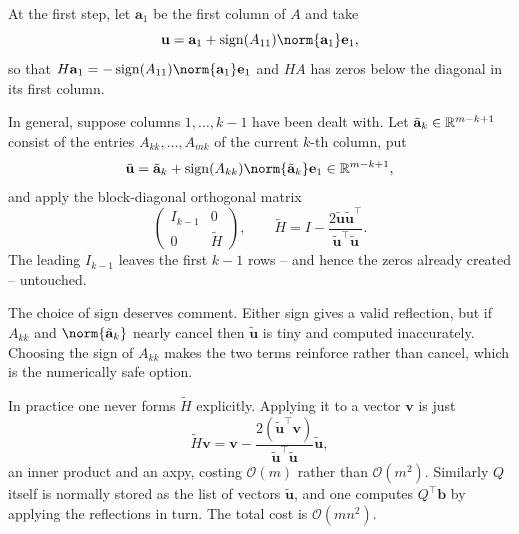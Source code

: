 \documentclass[a4paper]{scrartcl}
\begin{document}
\begin{method}[Householder QR]
  At the first step, let $\mathbf a_1$ be the first column of $A$ and take
  $$
  \mathbf u = \mathbf a_1 + \sign(A_{11})\norm{\mathbf a_1}\mathbf e_1,
  $$
  so that $H\mathbf a_1 = -\sign(A_{11})\norm{\mathbf a_1}\mathbf e_1$ and $HA$ has zeros below the diagonal in its first column.

  In general, suppose columns $1, \dots, k-1$ have been dealt with. Let $\tilde{\mathbf a}_k \in \mathbb{R}^{m-k+1}$ consist of the entries $A_{kk}, \dots, A_{mk}$ of the current $k$-th column, put
  $$
  \tilde{\mathbf u} = \tilde{\mathbf a}_k + \sign(A_{kk})\norm{\tilde{\mathbf a}_k}\mathbf e_1 \in \R^{m-k+1},
  $$
  and apply the block-diagonal orthogonal matrix
  $$
  \begin{pmatrix} I_{k-1} & 0\\ 0 & \tilde H\end{pmatrix}, \qquad \tilde H = I - \frac{2\tilde{\mathbf u}\tilde{\mathbf u}^\top}{\tilde{\mathbf u}^\top\tilde{\mathbf u}}.
  $$
  The leading $I_{k-1}$ leaves the first $k-1$ rows -- and hence the zeros already created -- untouched.
\end{method}

The choice of sign deserves comment. Either sign gives a valid reflection, but if $A_{kk}$ and $\norm{\tilde{\mathbf a}_k}$ nearly cancel then $\tilde{\mathbf u}$ is tiny and computed inaccurately. Choosing the sign of $A_{kk}$ makes the two terms reinforce rather than cancel, which is the numerically safe option.

In practice one never forms $\tilde H$ explicitly. Applying it to a vector $\mathbf v$ is just
$$
\tilde H\mathbf v = \mathbf v - \frac{2(\tilde{\mathbf u}^\top\mathbf v)}{\tilde{\mathbf u}^\top\tilde{\mathbf u}}\tilde{\mathbf u},
$$
an inner product and an axpy, costing $\mathcal{O}(m)$ rather than $\mathcal{O}(m^2)$. Similarly $Q$ itself is normally stored as the list of vectors $\tilde{\mathbf u}$, and one computes $Q^\top\mathbf b$ by applying the reflections in turn. The total cost is $\mathcal{O}(mn^2)$.
\end{document}

